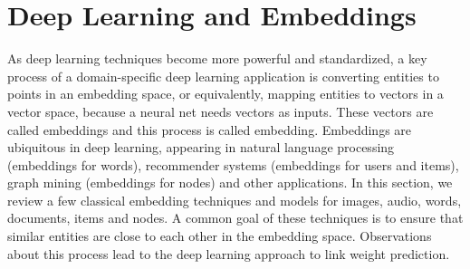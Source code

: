 \documentclass[12pt]{WSUThesis}
\theoremstyle{definition}
\begin{document}
\section{Deep Learning and Embeddings}
As deep learning techniques become more powerful and standardized,
a key process of a domain-specific deep learning application
is converting entities to points in an embedding space, or equivalently,
mapping entities to vectors in a vector space,
because a neural net needs vectors as inputs.
These vectors are called embeddings and this process is called embedding.
Embeddings are ubiquitous in deep learning,
appearing in natural language processing (embeddings for words), recommender systems (embeddings for users and items),
graph mining (embeddings for nodes) and other applications.
In this section, we review a few classical embedding techniques and models for images, audio, words, documents, items and nodes.
A common goal of these techniques is to ensure that
similar entities are close to each other in the embedding space.
Observations about this process lead to the deep learning approach to link weight prediction.
\end{document}
